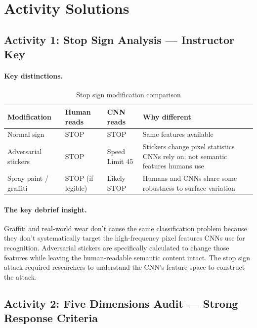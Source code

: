\section{Activity Solutions}

\subsection{Activity 1: Stop Sign Analysis --- Instructor Key}

\paragraph{Key distinctions.}

\begin{table}[htbp]
\caption{Stop sign modification comparison}
\label{tab:stop-sign-key}
\centering
\begin{tabular}{@{}p{4cm}p{3cm}p{3cm}p{3cm}@{}}
\toprule
\textbf{Modification} & \textbf{Human reads} & \textbf{CNN reads} & \textbf{Why different} \\
\midrule
Normal sign & STOP & STOP & Same features available \\
Adversarial stickers & STOP & Speed Limit 45 & Stickers change pixel statistics CNNs rely on; not semantic features humans use \\
Spray paint / graffiti & STOP (if legible) & Likely STOP & Humans and CNNs share some robustness to surface variation \\
\bottomrule
\end{tabular}
\end{table}

\paragraph{The key debrief insight.}

Graffiti and real-world wear don't cause the same classification problem because they don't systematically target the high-frequency pixel features CNNs use for recognition. Adversarial stickers are specifically calculated to change those features while leaving the human-readable semantic content intact. The stop sign attack required researchers to understand the CNN's feature space to construct the attack.

\subsection{Activity 2: Five Dimensions Audit --- Strong Response Criteria}

